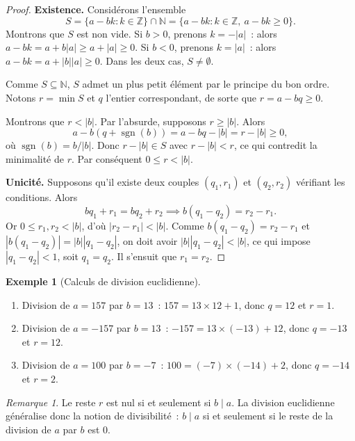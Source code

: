 \documentclass[12pt,a4paper,openany]{book}
\theoremstyle{definition}
\newtheorem{exemple}[definition]{Exemple}
\theoremstyle{plain}
\theoremstyle{remark}
\newtheorem{remarque}[definition]{Remarque}
\newcommand{\N}{\mathbb{N}}
\newcommand{\Z}{\mathbb{Z}}
\newcommand{\abs}[1]{\left|#1\right|}
\begin{document}
\begin{proof}
\textbf{Existence.}
Considérons l'ensemble
\[
  S = \{a - bk : k \in \Z\} \cap \N = \{a - bk : k \in \Z,\ a - bk \geq 0\}.
\]
Montrons que $S$ est non vide. Si $b > 0$, prenons $k = -\abs{a}$~: alors
$a - bk = a + b\abs{a} \geq a + \abs{a} \geq 0$. Si $b < 0$, prenons
$k = \abs{a}$~: alors $a - bk = a + \abs{b}\abs{a} \geq 0$. Dans les deux cas,
$S \neq \emptyset$.

Comme $S \subseteq \N$, $S$ admet un plus petit élément par le principe du bon
ordre. Notons $r = \min S$ et $q$ l'entier correspondant,
de sorte que $r = a - bq \geq 0$.

Montrons que $r < \abs{b}$. Par l'absurde, supposons $r \geq \abs{b}$. Alors
\[
  a - b(q + \operatorname{sgn}(b)) = a - bq - \abs{b} = r - \abs{b} \geq 0,
\]
où $\operatorname{sgn}(b) = b/\abs{b}$. Donc $r - \abs{b} \in S$ avec
$r - \abs{b} < r$, ce qui contredit la minimalité de $r$. Par conséquent
$0 \leq r < \abs{b}$.

\medskip
\textbf{Unicité.}
Supposons qu'il existe deux couples $(q_1, r_1)$ et $(q_2, r_2)$ vérifiant les
conditions. Alors
\[
  bq_1 + r_1 = bq_2 + r_2 \implies b(q_1 - q_2) = r_2 - r_1.
\]
Or $0 \leq r_1, r_2 < \abs{b}$, d'où $\abs{r_2 - r_1} < \abs{b}$.
Comme $b(q_1 - q_2) = r_2 - r_1$ et $\abs{b(q_1-q_2)} = \abs{b}\abs{q_1-q_2}$,
on doit avoir $\abs{b}\abs{q_1-q_2} < \abs{b}$, ce qui impose
$\abs{q_1-q_2} < 1$, soit $q_1 = q_2$. Il s'ensuit que $r_1 = r_2$.
\end{proof}

\begin{exemple}[Calculs de division euclidienne]
\label{ex:div_eucl}
\begin{enumerate}[label=(\roman*)]
  \item Division de $a = 157$ par $b = 13$~:
    $157 = 13 \times 12 + 1$, donc $q = 12$ et $r = 1$.
  \item Division de $a = -157$ par $b = 13$~:
    $-157 = 13 \times (-13) + 12$, donc $q = -13$ et $r = 12$.
  \item Division de $a = 100$ par $b = -7$~:
    $100 = (-7)\times(-14) + 2$, donc $q = -14$ et $r = 2$.
\end{enumerate}
\end{exemple}

\begin{remarque}
\label{rem:div_eucl:divisible}
Le reste $r$ est nul si et seulement si $b \mid a$. La division euclidienne
généralise donc la notion de divisibilité~: $b \mid a$ si et seulement si
le reste de la division de $a$ par $b$ est $0$.
\end{remarque}
\end{document}
